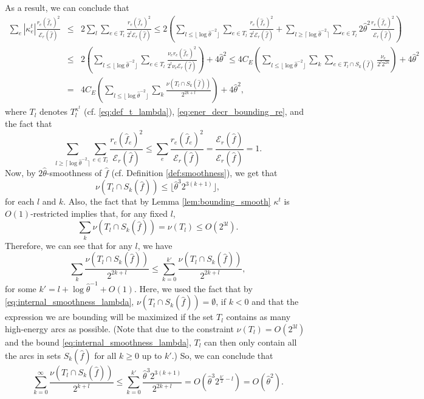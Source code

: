 \documentclass[11pt, letterpaper]{article}
\newcommand{\cenergy}{C_{E}}
\newcommand{\ceil}[1]{\lceil #1 \rceil}
\newcommand{\floor}[1]{\lfloor #1 \rfloor}
\newcommand{\energy}[2]{\mathcal{E}_{#1}(#2)}
\newcommand{\Cset}[2]{S_{#1}(#2)}
\newcommand{\hf}{\hat{f}}
\newcommand{\htheta}{\hat{\theta}}
\newcommand{\vnu}{\boldsymbol{\mathit{\nu}}}
\newcommand{\vkappa}{\boldsymbol{\mathit{{\kappa}}}}
\newcommand{\hff}{\boldsymbol{\mathit{\hat{f}}}}
\newcommand{\rr}{\boldsymbol{\mathit{r}}}
\begin{document}
As a result, we can conclude that
\begin{eqnarray*}
\sum_e  |\kappa_e^t|\frac{r_e (\hf_e)^2}{\energy{\rr}{\hff}} &\leq& 2 \sum_{l} \sum_{e\in T_l} \frac{r_e (\hf_e)^2}{2^l \energy{\rr}{\hff}}  \leq 2 \left(\sum_{l\leq \floor{\log \htheta^{-2}}} \sum_{e\in T_l} \frac{r_e (\hf_e)^2}{2^l\energy{\rr}{\hff}}+\sum_{l\geq \ceil{\log \htheta^{-2}}} \sum_{e\in T_l} 2 \htheta^{2} \frac{r_e (\hf_e)^2}{\energy{\rr}{\hff}}\right)\\
&\leq & 2 \left(\sum_{l\leq \floor{\log \htheta^{-2}}} \sum_{e\in T_l} \frac{\nu_e r_e (\hf_e)^2}{2^l\nu_e\energy{\rr}{\hff}}\right) +4 \htheta^{2} \leq 4 \cenergy  \left(\sum_{l\leq \floor{\log \htheta^{-2}}} \sum_{k} \sum_{e\in T_l\cap \Cset{k}{\hff}} \frac{\nu_e}{2^l2^{2k}}\right) + 4\htheta^2\\
 & =& 4\cenergy \left(\sum_{l\leq \floor{\log \htheta^{-2}}} \sum_{k} \frac{\vnu(T_l\cap \Cset{k}{\hff})}{2^{2k+l}}\right) + 4 \htheta^2,
\end{eqnarray*}
where $T_l$ denotes $T_l^{\vkappa^t}$ (cf. \eqref{eq:def_t_lambda}), \eqref{eq:ener_decr_bounding_re}, and the fact that 
\[
\sum_{l\geq \ceil{\log \htheta^{-2}}} \sum_{e\in T_l} \frac{r_e (\hf_e)^2}{\energy{\rr}{\hff}}\leq \sum_e \frac{r_e (\hf_e)^2}{\energy{\rr}{\hff}} = \frac{\energy{\rr}{\hff}}{\energy{\rr}{\hff}}=1.
\]
Now, by $2\htheta$-smoothness of $\hff$ (cf. Definition \ref{def:smoothness}), we get that 
\begin{equation}
\label{eq:internal_smoothness_lambda}
\vnu(T_l\cap \Cset{k}{\hff})\leq \floor{\htheta^3 2^{3(k+1)}},
\end{equation}
for each $l$ and $k$. Also, the fact that by Lemma \ref{lem:bounding_smooth} $\vkappa^t$ is $O(1)$-restricted implies that, for any fixed $l$, 
\[
\sum_{k}\vnu(T_l\cap \Cset{k}{\hff})=\vnu(T_l) \leq O(2^{3l}).
\]
Therefore, we can see that for any $l$, we have
\[
\sum_{k} \frac{\vnu(T_l\cap \Cset{k}{\hff})}{2^{2k+l}}\leq \sum_{k=0}^{k'} \frac{\vnu(T_l\cap \Cset{k}{\hff})}{2^{2k+l}},
\]
for some $k'=l+\log \htheta^{-1}+O(1)$. Here, we used the fact that by \eqref{eq:internal_smoothness_lambda}, $\vnu(T_l\cap \Cset{k}{\hff})=\emptyset$, if $k<0$ and that the expression we are bounding will be maximized if the set $T_l$ contains as many high-energy arcs as possible. (Note that due to the constraint $\vnu(T_l)= O(2^{3l})$ and the bound \eqref{eq:internal_smoothness_lambda}, $T_l$ can then only contain all the arcs in sets $\Cset{k}{\hff}$ for all $k\geq 0$ up to $k'$.) So, we can conclude that
\[
 \sum_{k=0}^{\infty} \frac{\vnu(T_l\cap \Cset{k}{\hff})}{2^{k+l}}  \leq \sum_{k=0}^{k'} \frac{\htheta^3 2^{3(k+1)}}{2^{2k+l}} = O(\htheta^3 2^{\frac{k'}{2}-l})=O(\htheta^2).
\]
\end{document}
